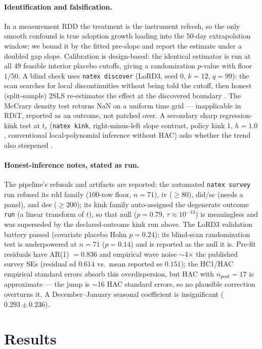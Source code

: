 \documentclass[11pt]{article}
\begin{document}
\paragraph{Identification and falsification.} In a measurement RDD the
treatment is the instrument refresh, so the only smooth confound is true
adoption growth loading into the 50-day extrapolation window; we bound it by
the fitted pre-slope and report the estimate under a doubled gap slope.
Calibration is design-based: the identical estimator is run at all 49
feasible interior placebo cutoffs, giving a randomization $p$-value with
floor $1/50$. A blind check uses \texttt{natex discover} (LoRD3, seed 0,
$k=12$, $q=99$): the scan searches for local discontinuities without being
told the cutoff, then honest (split-sample) 2SLS re-estimates the effect at
the discovered boundary \cite{herlands2018,natex}. The McCrary density test
\cite{mccrary2008} returns NaN on a uniform time grid --- inapplicable in
RDiT, reported as an outcome, not patched over. A secondary sharp
regression-kink test at $t_c$ (\texttt{natex kink}, right-minus-left slope
contrast, policy kink 1, $h=1.0$, conventional local-polynomial inference
without HAC) asks whether the trend also steepened \cite{card2015,
bockerman2025}.

\paragraph{Honest-inference notes, stated as run.} The pipeline's refusals
and artifacts are reported: the automated \texttt{natex survey} run refused
its rdd family (100-row floor, $n=71$), iv ($\geq 80$), did/sc (needs a
panel), and dee ($\geq 200$); its kink family auto-assigned the degenerate
outcome \texttt{run} (a linear transform of $t$), so that null
($p=0.79$, $\tau \approx 10^{-13}$) is meaningless and was superseded by the
declared-outcome kink run above. The LoRD3 validation battery passed
(covariate placebo Holm $p=0.24$); its blind-scan randomization test is
underpowered at $n=71$ ($p=0.14$) and is reported as the null it is.
Pre-fit residuals have AR(1) $=0.836$ and empirical wave noise $\sim$4$\times$
the published survey SEs (residual sd $0.614$ vs.\ mean reported se $0.151$);
the HC1/HAC empirical standard errors absorb this overdispersion, but HAC
with $n_{\text{post}}=17$ is approximate --- the jump is $\sim$16 HAC standard
errors, so no plausible correction overturns it. A December--January seasonal
coefficient is insignificant ($0.293 \pm 0.236$).

\section{Results}\label{sec:results}
\end{document}
